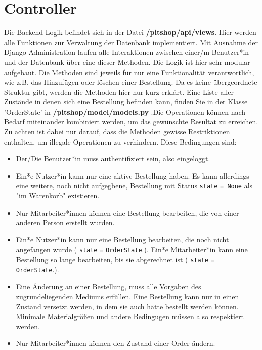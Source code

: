 \documentclass[12pt]{article}
\newcommand{\dir}[1]{\textbf{/#1}}
\newcommand{\attribute}[1]{{\color{orange} \texttt{#1}}}
\newcommand{\orderState}[1]{{\color{red}\texttt{OrderState}\color{black}.\color{blue}{#1}}}
\begin{document}
\section{Controller}
Die Backend-Logik befindet sich in der Datei \dir{pitshop/api/views}. Hier werden alle Funktionen zur Verwaltung der Datenbank implementiert. Mit Ausnahme der Django-Administration laufen alle Interaktionen zwischen einer/m Benutzer*in 
und der Datenbank über eine dieser Methoden. Die Logik ist hier sehr modular aufgebaut. Die Methoden sind jeweils für nur eine Funktionalität verantwortlich, wie z.B. das Hinzufügen oder löschen einer Bestellung. 
Da es keine übergeordnete Struktur gibt, werden die Methoden hier nur kurz erklärt. Eine Liste aller Zustände in denen sich eine Bestellung befinden kann, finden Sie in der Klasse 'OrderState' in \dir{pitshop/model/models.py} .Die Operationen können nach Bedarf miteinander kombiniert werden, um das gewünschte Resultat zu erreichen.
Zu achten ist dabei nur darauf, dass die Methoden gewisse Restriktionen enthalten, um illegale Operationen zu verhindern. 
Diese Bedingungen sind: \\ %
\begin{itemize}
\item Der/Die Benutzer*in muss authentifiziert sein, also eingeloggt.
\item Ein*e Nutzer*in kann nur eine aktive Bestellung haben. Es kann allerdings eine weitere, noch nicht aufgegbene, Bestellung mit Status \attribute{state} \texttt{= None} als "im Warenkorb" existieren.
\item Nur Mitarbeiter*innen können eine Bestellung bearbeiten, die von einer anderen Person erstellt wurden.
\item Ein*e Nutzer*in kann nur eine Bestellung bearbeiten, die noch nicht angefangen wurde (\attribute{state} \texttt{=} \orderState{SUBMITTED}). Ein*e Mitarbeiter*in kann eine Bestellung so lange bearbeiten, bis sie abgerechnet ist (\attribute{state} \texttt{=} \orderState{BILLED}).
\item Eine Änderung an einer Bestellung, muss alle Vorgaben des zugrundeliegenden Mediums erfüllen. Eine Bestellung kann nur in einen Zustand versetzt werden, in dem sie auch hätte bestellt werden können. Minimale Materialgrößen und andere Bedingugen 
müssen also respektiert werden.
\item Nur Mitarbeiter*innen können den Zustand einer Order ändern.
\end{itemize}

\newpage
\end{document}
